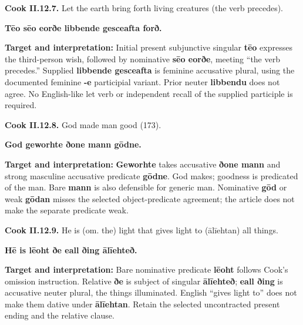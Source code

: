 \par\begin{minipage}{\linewidth}\raggedright
\textbf{Cook II.12.7.} Let the earth bring forth living creatures (the verb precedes).

\textbf{Tēo sēo eorðe libbende gesceafta forð.}

\textbf{Target and interpretation:} Initial present subjunctive singular \textbf{tēo} expresses the third-person wish, followed by nominative \textbf{sēo eorðe}, meeting “the verb precedes.” Supplied \textbf{libbende gesceafta} is feminine accusative plural, using the documented feminine \textbf{-e} participial variant. Prior neuter \textbf{libbendu} does not agree. No English-like let verb or independent recall of the supplied participle is required.

\end{minipage}\par\addvspace{4pt}

\par\begin{minipage}{\linewidth}\raggedright
\textbf{Cook II.12.8.} God made man good (173).

\textbf{God geworhte ðone mann gōdne.}

\textbf{Target and interpretation:} \textbf{Geworhte} takes accusative \textbf{ðone mann} and strong masculine accusative predicate \textbf{gōdne}. God makes; goodness is predicated of the man. Bare \textbf{mann} is also defensible for generic man. Nominative \textbf{gōd} or weak \textbf{gōdan} misses the selected object-predicate agreement; the article does not make the separate predicate weak.

\end{minipage}\par\addvspace{4pt}

\par\begin{minipage}{\linewidth}\raggedright
\textbf{Cook II.12.9.} He is (om. the) light that gives light to (ālīehtan) all things.

\textbf{Hē is lēoht ðe eall ðing ālīehteð.}

\textbf{Target and interpretation:} Bare nominative predicate \textbf{lēoht} follows Cook's omission instruction. Relative \textbf{ðe} is subject of singular \textbf{ālīehteð}; \textbf{eall ðing} is accusative neuter plural, the things illuminated. English “gives light to” does not make them dative under \textbf{ālīehtan}. Retain the selected uncontracted present ending and the relative clause.

\end{minipage}\par\addvspace{4pt}

